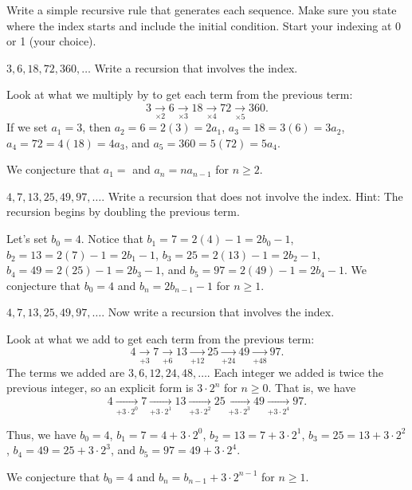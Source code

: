 \begin{exam}
\label{exam_next_term_recursive}
    Write a simple recursive rule that generates each sequence. Make sure you state where the index starts and include the initial condition.  Start your indexing at 0 or 1 (your choice). 
        \begin{apart}
            \item $3, 6, 18, 72, 360, \ldots$   Write a recursion that involves the index.
                \begin{soln}
                    Look at what we multiply by to get each term from the previous term:
                        $$3 \xrightarrow[\times 2]{} 6
                        \xrightarrow[\times 3]{} 18
                        \xrightarrow[\times 4]{} 72
                        \xrightarrow[\times 5]{} 360.$$
                    If we set $a_1=3$, then $a_2=6 =2(3)=2a_1$, $a_3=18 =3(6)=3a_2$, $a_4=72 =4(18)=4a_3$, and $a_5=360 =5(72)=5a_4$.

                    We conjecture that $a_1=$ and $a_n=na_{n-1}$ for $n \ge 2$.
                \end{soln}
            \item $4, 7, 13, 25, 49, 97, \ldots$. Write a recursion that does not involve the index. Hint: The recursion begins by doubling the previous term.
                \begin{soln}
                    Let's set $b_0 = 4$.  Notice that $b_1=7 = 2(4)-1=2b_0-1$, $b_2=13 = 2(7)-1=2b_1-1$, $b_3=25 = 2(13)-1=2b_2-1$,  $b_4=49 = 2(25)-1=2b_3-1$, and $b_5=97 = 2(49)-1=2b_4-1$.  We conjecture that $b_0 = 4$ and $b_n=2b_{n-1}-1$ for $n \ge 1$.
                \end{soln}
            \item $4, 7, 13, 25, 49, 97, \ldots$. Now write a recursion that involves the index. 
                \begin{soln}
                     Look at what we add to get each term from the previous term:
                        $$4 \xrightarrow[+ 3]{} 7
                        \xrightarrow[+ 6]{} 13
                        \xrightarrow[+ 12]{} 25
                        \xrightarrow[+ 24]{} 49
                        \xrightarrow[+ 48]{} 97.$$
                     The terms we added are $3, 6, 12, 24, 48, \ldots$.  Each integer we added is twice the previous integer, so an explicit form is $3\cdot 2^n$ for $n \ge 0$.  That is, we have 
                        $$4 \xrightarrow[+ 3\cdot 2^0]{} 7
                        \xrightarrow[+ 3\cdot 2^1]{} 13
                        \xrightarrow[+ 3\cdot 2^2]{} 25
                        \xrightarrow[+ 3\cdot 2^3]{} 49
                        \xrightarrow[+ 3\cdot 2^4]{} 97.$$

                    Thus, we have $b_0=4$, $b_1 = 7 = 4+ 3\cdot 2^0$, $b_2 = 13 = 7+ 3\cdot 2^1$, $b_3 = 25 = 13+ 3\cdot 2^2$, $b_4 = 49 = 25+ 3\cdot 2^3$, and $b_5 = 97 = 49+ 3\cdot 2^4$.

                     We conjecture that $b_0=4$ and $b_n=b_{n-1}+3\cdot2^{n-1}$ for $n \ge 1$.
                \end{soln}
        \end{apart}
\end{exam}

